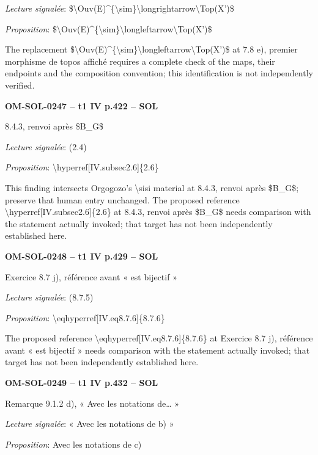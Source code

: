 \emph{Lecture signalée}: \$\textbackslash{}Ouv(E)\textasciicircum{}\{\textbackslash{}sim\}\textbackslash{}longrightarrow\textbackslash{}Top(X')\$\par
\emph{Proposition}: \$\textbackslash{}Ouv(E)\textasciicircum{}\{\textbackslash{}sim\}\textbackslash{}longleftarrow\textbackslash{}Top(X')\$\par
The replacement \$\textbackslash{}Ouv(E)\textasciicircum{}\{\textbackslash{}sim\}\textbackslash{}longleftarrow\textbackslash{}Top(X')\$ at 7.8 e), premier morphisme de topos affiché requires a complete check of the maps, their endpoints and the composition convention; this identification is not independently verified.\par
\par\noindent\textbf{OM-SOL-0247 -- t1 IV p.422 -- SOL}\par
8.4.3, renvoi après \$B\_G\$\par
\emph{Lecture signalée}: (2.4)\par
\emph{Proposition}: \textbackslash{}hyperref[IV.subsec2.6]\{2.6\}\par
This finding intersects Orgogozo's \textbackslash{}sisi material at 8.4.3, renvoi après \$B\_G\$; preserve that human entry unchanged. The proposed reference \textbackslash{}hyperref[IV.subsec2.6]\{2.6\} at 8.4.3, renvoi après \$B\_G\$ needs comparison with the statement actually invoked; that target has not been independently established here.\par
\par\noindent\textbf{OM-SOL-0248 -- t1 IV p.429 -- SOL}\par
Exercice 8.7 j), référence avant « est bijectif »\par
\emph{Lecture signalée}: (8.7.5)\par
\emph{Proposition}: \textbackslash{}eqhyperref[IV.eq8.7.6]\{8.7.6\}\par
The proposed reference \textbackslash{}eqhyperref[IV.eq8.7.6]\{8.7.6\} at Exercice 8.7 j), référence avant « est bijectif » needs comparison with the statement actually invoked; that target has not been independently established here.\par
\par\noindent\textbf{OM-SOL-0249 -- t1 IV p.432 -- SOL}\par
Remarque 9.1.2 d), « Avec les notations de… »\par
\emph{Lecture signalée}: « Avec les notations de b) »\par
\emph{Proposition}: Avec les notations de c)\par
